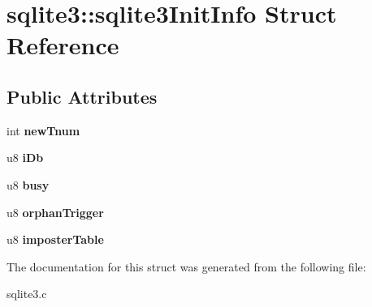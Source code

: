 \hypertarget{structsqlite3_1_1sqlite3InitInfo}{}\section{sqlite3\+:\+:sqlite3\+Init\+Info Struct Reference}
\label{structsqlite3_1_1sqlite3InitInfo}
\subsection*{Public Attributes}
\begin{DoxyCompactItemize}
\item 
int {\bfseries new\+Tnum}\hypertarget{structsqlite3_1_1sqlite3InitInfo_a65250c8c5f215989e64294ede6c1c268}{}\label{structsqlite3_1_1sqlite3InitInfo_a65250c8c5f215989e64294ede6c1c268}

\item 
u8 {\bfseries i\+Db}\hypertarget{structsqlite3_1_1sqlite3InitInfo_af72389cb54753544c0f578605e6604bb}{}\label{structsqlite3_1_1sqlite3InitInfo_af72389cb54753544c0f578605e6604bb}

\item 
u8 {\bfseries busy}\hypertarget{structsqlite3_1_1sqlite3InitInfo_a6ac01842e0ae68023cb60fea93bd8688}{}\label{structsqlite3_1_1sqlite3InitInfo_a6ac01842e0ae68023cb60fea93bd8688}

\item 
u8 {\bfseries orphan\+Trigger}\hypertarget{structsqlite3_1_1sqlite3InitInfo_ac292839cc81d109206133a80949c45a6}{}\label{structsqlite3_1_1sqlite3InitInfo_ac292839cc81d109206133a80949c45a6}

\item 
u8 {\bfseries imposter\+Table}\hypertarget{structsqlite3_1_1sqlite3InitInfo_a97d9d576e85a1752092122374a179139}{}\label{structsqlite3_1_1sqlite3InitInfo_a97d9d576e85a1752092122374a179139}

\end{DoxyCompactItemize}


The documentation for this struct was generated from the following file\+:\begin{DoxyCompactItemize}
\item 
sqlite3.\+c\end{DoxyCompactItemize}
